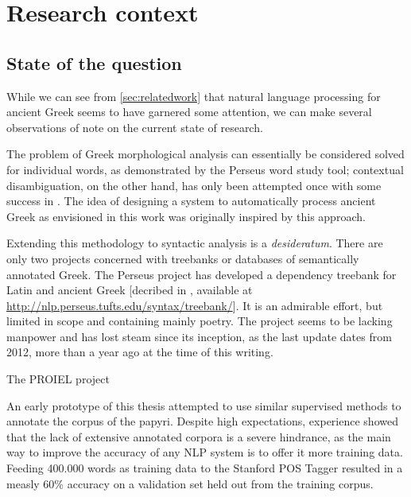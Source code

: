 
\section{Research context}

\subsection{State of the question}

While we can see from \ref{sec:relatedwork} that natural language
processing for ancient Greek seems to have garnered some attention, we
can make several observations of note on the current state of research.

The problem of Greek morphological analysis can essentially be
considered solved for individual words, as demonstrated by the Perseus
word study tool; contextual disambiguation, on the other hand, has
only been attempted once with some success in
\cite{dik2008,dik2009}. The idea of designing a system to
automatically process ancient Greek as envisioned in this work was
originally inspired by this approach.

Extending this methodology to syntactic analysis is a
\textit{desideratum}. There are only two projects concerned with
treebanks or databases of semantically annotated Greek. The Perseus
project has developed a dependency treebank for Latin and ancient
Greek [decribed in \cite{bammancrane2011}, available at
\url{http://nlp.perseus.tufts.edu/syntax/treebank/}]. It is an
admirable effort, but limited in scope and containing mainly poetry.
The project seems to be lacking manpower and has lost steam since its
inception, as the last update dates from 2012, more than a year ago at
the time of this writing.

The PROIEL project \citep{proiel}

An early prototype of this thesis attempted to use similar supervised
methods to annotate the corpus of the papyri. Despite high
expectations, experience showed that the lack of extensive annotated
corpora is a severe hindrance, as the main way to improve the accuracy
of any NLP system is to offer it more training data. Feeding 400.000
words as training data to the Stanford POS Tagger resulted in a measly
60\% accuracy on a validation set held out from the training corpus.

